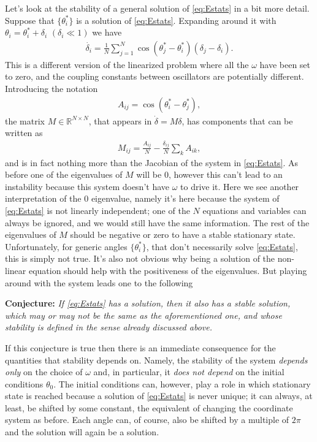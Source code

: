 \documentclass[10pt,a4paper,twocolumn]{article}
\begin{document}
Let's look at the stability of a general solution of \cref{eq:Estats} in a bit more detail. Suppose that $\{\theta^*_i\}$ is a solution of \cref{eq:Estats}. Expanding around it with $\theta_i = \theta^*_i + \delta_i$ $(\delta_i \ll 1)$ we have
%
\begin{align}
    \dot{\delta_i} = \frac{1}{N} \sum_{j=1}^N \cos(\theta^*_j - \theta^*_i) (\delta_j - \delta_i).
\end{align}
%
This is a different version of the linearized problem where all the $\omega$ have been set to zero, and the coupling constants between oscillators are potentially different. Introducing the notation
%
\begin{align}
    A_{ij} = \cos(\theta_i^* - \theta_j^*),
\end{align}
%
the matrix $M \in \mathbb{R}^{N \times N}$, that appears in $\dot{\delta} = M \delta$, has components that can be written as
%
\begin{align}
    M_{ij} = \frac{A_{ij}}{N} - \frac{\delta_{ij}}{N} \sum_{k} A_{ik}, 
\end{align}
%
and is in fact nothing more than the Jacobian of the system in \cref{eq:Estats}. As before one of the eigenvalues of $M$ will be $0$, however this can't lead to an instability because this system doesn't have $\omega$ to drive it. Here we see another interpretation of the $0$ eigenvalue, namely it's here because the system of \cref{eq:Estats} is not linearly independent; one of the $N$ equations and variables can always be ignored, and we would still have the same information. The rest of the eigenvalues of $M$ should be negative or zero to have a stable stationary state. Unfortunately, for generic angles $\{\theta^*_i\}$, that don't necessarily solve \cref{eq:Estats}, this is simply not true. It's also not obvious why being a solution of the non-linear equation should help with the positiveness of the eigenvalues. But playing around with the system leads one to the following

\vspace{1em}
\textbf{Conjecture:} \textit{If \cref{eq:Estats} has a solution, then it also has a stable solution, which may or may not be the same as the aforementioned one, and whose stability is defined in the sense already discussed above.}
\vspace{1em}

If this conjecture is true then there is an immediate consequence for the quantities that stability depends on. Namely, the stability of the system \textit{depends only} on the choice of $\omega$ and, in particular, it \textit{does not depend} on the initial conditions $\theta_0$. The initial conditions can, however, play a role in which stationary state is reached because a solution of \cref{eq:Estats} is never unique; it can always, at least, be shifted by some constant, the equivalent of changing the coordinate system as before. Each angle can, of course, also be shifted by a multiple of $2 \pi$ and the solution will again be a solution.
\end{document}
